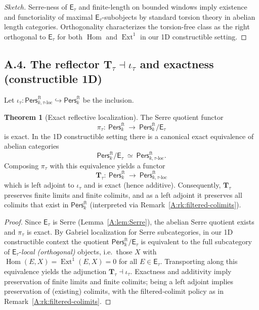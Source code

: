 \documentclass[11pt]{article}
\numberwithin{equation}{section}
\theoremstyle{plain}
\theoremstyle{definition}
\theoremstyle{remark}
\DeclareMathOperator{\Ext}{Ext}
\DeclareMathOperator{\Hom}{Hom}
\newcommand{\Pers}{\mathsf{Pers}}
\theoremstyle{plain}
\theoremstyle{definition}
\numberwithin{equation}{section}
\newtheorem{theorem}{Theorem}[section]
\theoremstyle{definition}
\numberwithin{equation}{section}
\theoremstyle{plain}
\theoremstyle{definition}
\theoremstyle{remark}
\begin{document}
\begin{proof}[Sketch]
Serre-ness of \(\mathsf{E}_\tau\) and finite-length on bounded windows imply existence and functoriality of maximal \(\mathsf{E}_\tau\)-subobjects by standard torsion theory in abelian length categories. Orthogonality characterizes the torsion-free class as the right orthogonal to \(\mathsf{E}_\tau\) for both \(\Hom\) and \(\Ext^1\) in our 1D constructible setting.
\end{proof}

\subsection*{A.4. The reflector \texorpdfstring{$\mathbf{T}_\tau\dashv\iota_\tau$}{T\_\tau ⊣ ι\_\tau} and exactness (constructible 1D)}
Let \(\iota_\tau:\Pers^{\mathrm{ft}}_{k,\tau\text{-loc}}\hookrightarrow\Pers^{\mathrm{ft}}_k\) be the inclusion.

\begin{theorem}[Exact reflective localization]\label{A:thm:localization}
The Serre quotient functor
\[
\pi_\tau:\ \Pers^{\mathrm{ft}}_k\ \longrightarrow\ \Pers^{\mathrm{ft}}_k/\mathsf{E}_\tau
\]
is exact. In the 1D constructible setting there is a canonical exact equivalence of abelian categories
\[
\Pers^{\mathrm{ft}}_k/\mathsf{E}_\tau \ \simeq\ \Pers^{\mathrm{ft}}_{k,\tau\text{-loc}}.
\]
Composing \(\pi_\tau\) with this equivalence yields a functor
\[
\mathbf{T}_\tau:\ \Pers^{\mathrm{ft}}_k\ \longrightarrow\ \Pers^{\mathrm{ft}}_{k,\tau\text{-loc}}
\]
which is left adjoint to \(\iota_\tau\) and is exact (hence additive).
Consequently, \(\mathbf{T}_\tau\) preserves finite limits and finite colimits, and as a left adjoint it preserves all colimits that exist in \(\Pers^{\mathrm{ft}}_k\) (interpreted via Remark~\ref{A:rk:filtered-colimits}).
\end{theorem}

\begin{proof}
Since \(\mathsf{E}_\tau\) is Serre (Lemma~\ref{A:lem:Serre}), the abelian Serre quotient exists and \(\pi_\tau\) is exact.
By Gabriel localization for Serre subcategories, in our 1D constructible context the quotient \(\Pers^{\mathrm{ft}}_k/\mathsf{E}_\tau\) is equivalent to the full subcategory of \(\mathsf{E}_\tau\)-\emph{local (orthogonal)} objects, i.e.\ those \(X\) with \(\Hom(E,X)=\Ext^1(E,X)=0\) for all \(E\in\mathsf{E}_\tau\).
Transporting along this equivalence yields the adjunction \(\mathbf{T}_\tau\dashv\iota_\tau\).
Exactness and additivity imply preservation of finite limits and finite colimits; being a left adjoint implies preservation of (existing) colimits, with the filtered-colimit policy as in Remark~\ref{A:rk:filtered-colimits}.
\end{proof}
\end{document}
